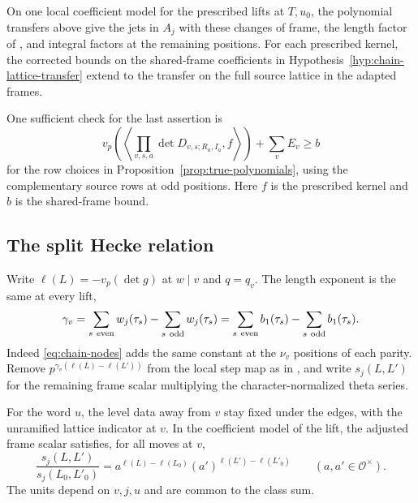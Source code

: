 \begin{hypothesis}[\openinput]\label{hyp:true-jet-model}
On one local coefficient model for the prescribed lifts at $T,u_0$,
the polynomial transfers above give the jets in $A_j$ with these
changes of frame, the length factor of \citep[Definition~11.9]{adriazola-grh},
and integral factors at the remaining positions.
For each prescribed kernel, the corrected bounds on the shared-frame
coefficients in Hypothesis~\ref{hyp:chain-lattice-transfer} extend to
the transfer on the full source lattice in the adapted frames.
\end{hypothesis}

One sufficient check for the last assertion is
\[
 v_p\!\left(\left\langle\prod_{v,s,a}\det D_{v,s;R_a,I_a},f\right\rangle\right)
                     +\sum_v E_v\ge b
\]
for the row choices in Proposition~\ref{prop:true-polynomials}, using
the complementary source rows at odd positions. Here $f$ is the
prescribed kernel and $b$ is the shared-frame bound.

\subsection{The split Hecke relation}

Write $\ell(L)=-v_p(\det g)$ at $w\mid v$ and $q=q_v$.
The length exponent is the same at every lift,
\[
 \gamma_v=\sum_{s\ {\rm even}}w_j(\tau_s)-\sum_{s\ {\rm odd}}w_j(\tau_s)
          =\sum_{s\ {\rm even}}b_1(\tau_s)-\sum_{s\ {\rm odd}}b_1(\tau_s).
\]
Indeed \eqref{eq:chain-nodes} adds the same constant at the
$\nu_v$ positions of each parity.
Remove $p^{\gamma_v(\ell(L)-\ell(L'))}$ from the local step map as in
\citep[Definition~11.9]{adriazola-grh}, and write $s_j(L,L')$ for
the remaining frame scalar multiplying the character-normalized theta series.

\begin{hypothesis}[\openinput]\label{hyp:true-frame-scalar}
For the word $u$, the level data away from $v$ stay fixed under the
edges, with the unramified lattice indicator at $v$. In the coefficient
model of the lift, the adjusted frame scalar satisfies, for all moves at $v$,
\[
 \frac{s_j(L,L')}{s_j(L_0,L'_0)}
       =a^{\ell(L)-\ell(L_0)}(a')^{\ell(L')-\ell(L'_0)}
       \qquad(a,a'\in\mathcal O^\times).
\]
The units depend on $v,j,u$ and are common to the class sum.
\end{hypothesis}

